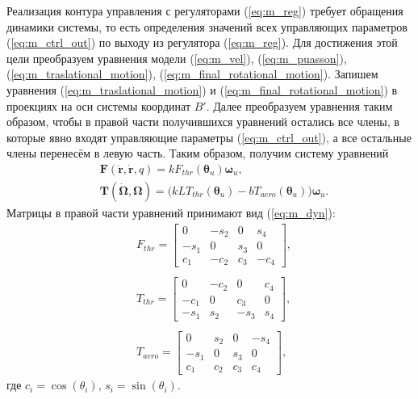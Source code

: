 Реализация контура управления с регуляторами (\ref{eq:m_reg}) требует обращения динамики системы, то есть определения значений всех управляющих параметров (\ref{eq:m_ctrl_out}) по выходу из регулятора (\ref{eq:m_reg}).
Для достижения этой цели преобразуем уравнения модели (\ref{eq:m_vel}), (\ref{eq:m_puasson}), (\ref{eq:m_traslational_motion}), (\ref{eq:m_final_rotational_motion}).
Запишем уравнения (\ref{eq:m_traslational_motion}) и (\ref{eq:m_final_rotational_motion}) в проекциях на оси системы координат $B'$.
Далее преобразуем уравнения таким образом, чтобы в правой части получившихся уравнений остались все члены, в которые явно входят управляющие параметры (\ref{eq:m_ctrl_out}), а все остальные члены перенесём в левую часть. Таким образом, получим систему уравнений
\begin{equation} \label{eq:m_dyn}
\begin{aligned}
&\bm F(\ddot{\bm r}, \dot{\bm r}, q) = k F_{thr} (\bm \theta_u) \bm \omega_u,\\
&\bm T(\dot{\bm \Omega}, \bm\Omega) = \Big(
kLT_{thr}(\bm\theta_u) - bT_{aero}(\bm\theta_u)
\Big)
\bm \omega_u.
\end{aligned}
\end{equation}
Матрицы в правой части уравнений принимают вид (\ref{eq:m_dyn}):
\begin{equation} \label{eq:m_dyn_matrixes}
\begin{aligned}
&F_{thr} =
\begin{bmatrix}
0&-s_2&0&s_4\\
-s_1&0&s_3&0\\
c_1&-c_2&c_3&-c_4
\end{bmatrix},
\\
\phantom{}
\\
&T_{thr} =
\begin{bmatrix}
0&-c_2&0&c_4\\
-c_1&0&c_3&0\\
-s_1&s_2&-s_3&s_4
\end{bmatrix},
\\
\phantom{}
\\
&T_{aero} =
\begin{bmatrix}
0&s_2&0&-s_4\\
-s_1&0&s_3&0\\
c_1&c_2&c_3&c_4
\end{bmatrix},
\end{aligned}
\end{equation}
где $c_i = \cos(\theta_i)$, $s_i = \sin(\theta_i)$.

